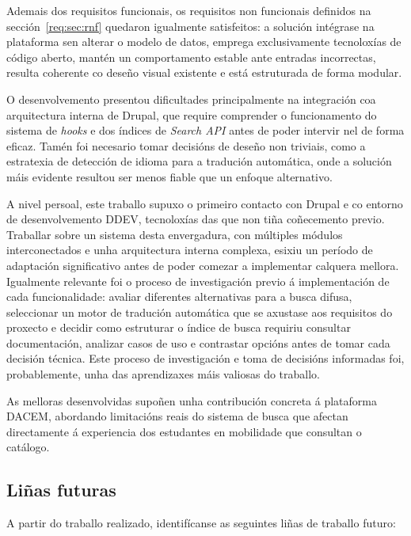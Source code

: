 \documentclass[%
    a4paper,               %
    twoside,               %
    10pt,                  %
]{article}                 %
\begin{document}
Ademais dos requisitos funcionais, os requisitos non funcionais definidos na sección~\ref{req:sec:rnf} quedaron igualmente satisfeitos: a solución intégrase na plataforma sen alterar o modelo de datos, emprega exclusivamente tecnoloxías de código aberto, mantén un comportamento estable ante entradas incorrectas, resulta coherente co deseño visual existente e está estruturada de forma modular.

O desenvolvemento presentou dificultades principalmente na integración coa arquitectura interna de Drupal, que require comprender o funcionamento do sistema de \textit{hooks} e dos índices de \textit{Search API} antes de poder intervir nel de forma eficaz. Tamén foi necesario tomar decisións de deseño non triviais, como a estratexia de detección de idioma para a tradución automática, onde a solución máis evidente resultou ser menos fiable que un enfoque alternativo.

A nivel persoal, este traballo supuxo o primeiro contacto con Drupal e co entorno de desenvolvemento DDEV, tecnoloxías das que non tiña coñecemento previo. Traballar sobre un sistema desta envergadura, con múltiples módulos interconectados e unha arquitectura interna complexa, esixiu un período de adaptación significativo antes de poder comezar a implementar calquera mellora. Igualmente relevante foi o proceso de investigación previo á implementación de cada funcionalidade: avaliar diferentes alternativas para a busca difusa, seleccionar un motor de tradución automática que se axustase aos requisitos do proxecto e decidir como estruturar o índice de busca requiriu consultar documentación, analizar casos de uso e contrastar opcións antes de tomar cada decisión técnica. Este proceso de investigación e toma de decisións informadas foi, probablemente, unha das aprendizaxes máis valiosas do traballo.

As melloras desenvolvidas supoñen unha contribución concreta á plataforma DACEM, abordando limitacións reais do sistema de busca que afectan directamente á experiencia dos estudantes en mobilidade que consultan o catálogo.

\subsection{Liñas futuras}

A partir do traballo realizado, identifícanse as seguintes liñas de traballo futuro:
\end{document}
